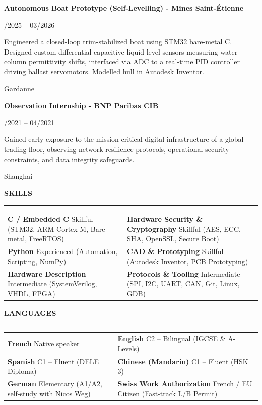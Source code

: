 \documentclass[10pt,a4paper]{article}
\newcommand{\cvSection}[1]{%
  \vspace{6.5pt}%
  {\fontsize{10.5}{12}\selectfont \textbf{#1}}\par\vspace{1.5pt}%
  \rule{\textwidth}{0.75pt}\par\vspace{4.5pt}%
}
\newcommand{\cvItem}[4]{%
  \noindent
  \parbox[t]{0.75\textwidth}{\raggedright \textbf{#1}}\hfill
  \parbox[t]{0.24\textwidth}{\raggedleft \fontsize{8.5}{10.5}\selectfont #2}\par
  \vspace{1.5pt}
  \noindent
  \parbox[t]{0.75\textwidth}{\fontsize{8.7}{11.2}\selectfont #4}\hfill
  \parbox[t]{0.24\textwidth}{\raggedleft \fontsize{8.5}{10.5}\selectfont #3}\par
  \vspace{5pt}
}
\begin{document}
\cvItem{Autonomous Boat Prototype (Self-Levelling) - Mines Saint-Étienne}{10/2025 -- 03/2026}{Gardanne}{Engineered a closed-loop trim-stabilized boat using STM32 bare-metal C. Designed custom differential capacitive liquid level sensors measuring water-column permittivity shifts, interfaced via ADC to a real-time PID controller driving ballast servomotors. Modelled hull in Autodesk Inventor.}

\cvItem{Observation Internship - BNP Paribas CIB}{04/2021 -- 04/2021}{Shanghai}{Gained early exposure to the mission-critical digital infrastructure of a global trading floor, observing network resilience protocols, operational security constraints, and data integrity safeguards.}

\cvSection{SKILLS}
\begin{tabularx}{\textwidth}{@{}X X@{}}
  \textbf{C / Embedded C} \newline
  {\fontsize{8.5}{10.5}\selectfont Skillful (STM32, ARM Cortex-M, Bare-metal, FreeRTOS)} &
  \textbf{Hardware Security \& Cryptography} \newline
  {\fontsize{8.5}{10.5}\selectfont Skillful (AES, ECC, SHA, OpenSSL, Secure Boot)} \\[4.5pt]
  
  \textbf{Python} \newline
  {\fontsize{8.5}{10.5}\selectfont Experienced (Automation, Scripting, NumPy)} &
  \textbf{CAD \& Prototyping} \newline
  {\fontsize{8.5}{10.5}\selectfont Skillful (Autodesk Inventor, PCB Prototyping)} \\[4.5pt]
  
  \textbf{Hardware Description} \newline
  {\fontsize{8.5}{10.5}\selectfont Intermediate (SystemVerilog, VHDL, FPGA)} &
  \textbf{Protocols \& Tooling} \newline
  {\fontsize{8.5}{10.5}\selectfont Intermediate (SPI, I2C, UART, CAN, Git, Linux, GDB)}
\end{tabularx}

\cvSection{LANGUAGES}
\begin{tabularx}{\textwidth}{@{}X X@{}}
  \textbf{French} \newline
  {\fontsize{8.5}{10.5}\selectfont Native speaker} &
  \textbf{English} \newline
  {\fontsize{8.5}{10.5}\selectfont C2 -- Bilingual (IGCSE \& A-Levels)} \\[4.5pt]
  
  \textbf{Spanish} \newline
  {\fontsize{8.5}{10.5}\selectfont C1 -- Fluent (DELE Diploma)} &
  \textbf{Chinese (Mandarin)} \newline
  {\fontsize{8.5}{10.5}\selectfont C1 -- Fluent (HSK 3)} \\[4.5pt]
  
  \textbf{German} \newline
  {\fontsize{8.5}{10.5}\selectfont Elementary (A1/A2, self-study with Nicos Weg)} &
  \textbf{Swiss Work Authorization} \newline
  {\fontsize{8.5}{10.5}\selectfont French / EU Citizen (Fast-track L/B Permit)}
\end{tabularx}
\end{document}
